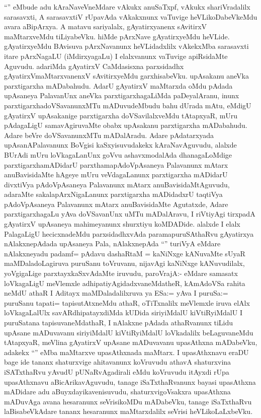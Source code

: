 \begin{artha}
``\stext'' eMbude adu kAraNaveVneMdare vAkukx anuSaTxpf, vAkukx shariVradalilx sarasavxti, A sarasavxtiV rUpavAda vAkakxnunx vaTuvige heVLikoDabeVkeMdu avara aBipArxya. A matavu sariyalalx, gAyatirxyanenx sAvitirxV maMtarxveMdu tiLiyabeVku. hiMde pArxNave gAyatirxyeMdu heVLide. gAyatirxyeMdu BAvisuva pArxNavanunx heVLidadxlilx vAkekxMba sarasavxti itare pArxNagaLU (iMdirxyagaLu) I elalxvanunx vaTuvige apiRsidaMte Aguvudu. adariMda gAyatirxV CaMdasisxna parxsidadhx gAyatirxVmaMtarxvanenxV sAvitirxyeMdu garxhisabeVku. upAsakanu aneVka parxtigarxha mADabahudu. AdarU gAyatirxV maMtarxda oMdu pAdada upAsaneya PalavanUnx aneVka parxtigarxhagaLiMda paDeyalAranu, inunx parxtigarxhadoVSavanunxMTu mADuvudeMbudu bahu dUrada mAtu, eMdigU gAyatirxV upAsakanige parxtigarxha doVSavilalxveMdu tAtapxyaR, mUru pAdagaLigU samavAgiruvaMte obabx upAsakanu parxtigarxha mADabahudu. Adare beVre doVSavanunxMTu mADalAradu. Adare pAdatarxyada upAsanAPalavanunx BoVgisi kaSxyisuvudakekx kAraNavAguvudu, alalxde BUrAdi mUru loVkagaLanUnx goVvu ashavxmodalAda dhanagaLoMdige parxtigarxhamADidarU parxthamapAdoVpAsaneya Palavanunx mAtarx anuBavisidaMte hAgeye mUru veVdagaLanunx parxtigarxha mADidarU divxtiVya pAdoVpAsaneya Palavanunx mAtarx anuBavisidaMtAguvudu, adaraMte sakalapArxNigaLanunx parxtigarxha mADidadxrU taqtiVya pAdoVpAsaneya Palavanunx mAtarx anuBavisidaMte Agutatxde, Adare parxtigarxhagaLu yAva doVSavanUnx uMTu mADalAravu, I riVtiyAgi tirxpadA gAyatirxV upAsaneya mahimeyanunx shurxtiyu koMDADide. alalxde I elalx PalagaLigU hecicxnadeMdu parxsidadhxvAda paramapuruSAthaRvu gAyatirxya nAlakxnepAdada upAsaneya Pala, nAlakxnepAda ``\stext'' turiVyA eMdare nAlakxneyadu padamf= pAdavu dashaRtaM = kaNiNxge kANuvaMte sUyaR maMDaladoLagiruva puruSanu toVruvanu, nijavAgi kaNiNxge kANuvudilalx, yoVgigaLige parxtayxkaSxvAdaMte iruvudu, paroVrajA:- eMdare samasatx loVkagaLigU meVlemxle adhipatiyAgidadxvaneMdatheR, kAmAdoVSa rahita neMdU athaR I Aditayx maMDaladalilxruva ya ESa:= yAva I puruSa:= puruSanu tapati= tapisutAtxneMdu athaR, oTiTxnalilx meVlemxle iruva elAlx loVkagaLalUlx savARdhipatayxdiMda kUDida siriyiMdalU kiVtiRyiMdalU I puruSatana tapisuvaneMdathaR, I nAlakxne pAdada athaRvanunx tiLidu upAsane mADuvavanu siriyiMdalU kiVtiRyiMdalU loVkadalilx beLaguvaneMdu tAtapxyaR, meVlina gAyatirxV upAsane mADuvavanu upasAthxna mADabeVku, adakekx ``\stext'' eMba maMtarxve upasAthxnada maMtarx. I upasAthxnavu eraDU bage ide tananx shaturxvige ahitavanunx koVruvudu athavA shaturxvina iSATxthaRvu yAvudU pUNaRvAgadirali eMdu koVruvudu itAyxdi rUpa upasAthxnavu aBicArikavAguvudu, tanage iSaTxthaRvanunx bayasi upasAthxna mADidare adu aBuyxdayikavenisuvudu, shaturxvigoVsakxra upasAthxna mADuvAga avana hesaranunx seVrisikoMDu mADabeVku, tanage iSaTxthaRvu laBisabeVkAdare tananx hesaranunx maMtarxdalilx seVrisi heVLikoLaLxbeVku.


\end{artha}
